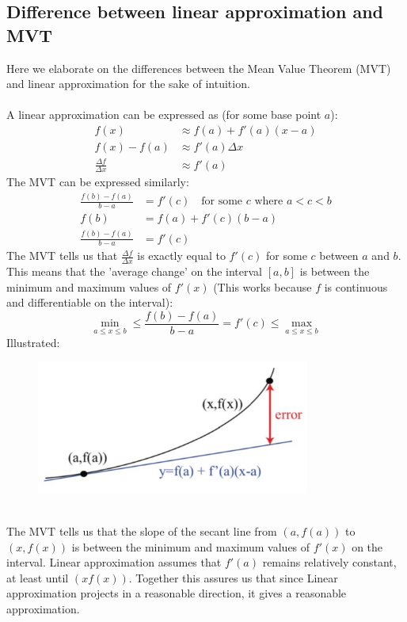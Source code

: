 \documentclass{report}
\begin{document}
\subsection{Difference between linear approximation and MVT} %
Here we elaborate on the differences between the Mean Value Theorem (MVT) and linear approximation for the sake of intuition.\\
\vspace{1mm}\\
A linear approximation can be expressed as (for some base point $a$):
\begin{align*}
f(x)&\approx f(a)+f'(a)(x-a)\\
f(x)-f(a)&\approx f'(a)\Delta x\\
\frac{\Delta f}{\Delta x}&\approx f'(a)
\end{align*}
The MVT can be expressed similarly:
\begin{align*}
\frac{f(b)-f(a)}{b-a}&=f'(c)\quad\text{for some $c$ where $a<c<b$}\\
f(b)&=f(a)+f'(c)(b-a)\\
\frac{f(b)-f(a)}{b-a}&=f'(c)
\end{align*}
The MVT tells us that $\frac{\Delta f}{\Delta x}$ is exactly equal to $f'(c)$ for some $c$ between $a$ and $b$. 
This means that the 'average change' on the interval $[a,b]$ is between the
 minimum and maximum values of $f'(x)$ (This works because $f$ is continuous and
differentiable on the interval):
\begin{equation*}
\min_{a\leq x\leq b}\leq \frac{f(b)-f(a)}{b-a}=f'(c)\leq \max_{a\leq x\leq b}
\end{equation*}
Illustrated:
\begin{figure}[h]
\includegraphics[width=9cm]{Capture24}\\
\centering
{}
\end{figure}\\
The MVT tells us that the slope of the secant line from $(a,f(a))$ to $(x,f(x))$ is 
between the minimum and maximum values of $f'(x)$ on the interval.
Linear approximation assumes that $f'(a)$ remains relatively constant, at least
until $(x f(x))$. Together this assures us that since Linear approximation projects
in a reasonable direction, it gives a reasonable approximation.
\newpage
\end{document}
